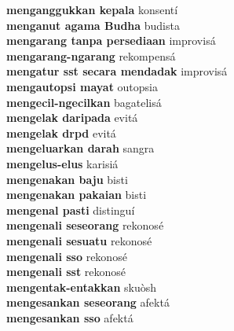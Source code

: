 \textbf{ menganggukkan kepala  } konsentí \\
\textbf{ menganut agama Budha  } budista \\
\textbf{ mengarang tanpa persediaan  } improvisá \\
\textbf{ mengarang-ngarang  } rekompensá \\
\textbf{ mengatur sst secara mendadak  } improvisá \\
\textbf{ mengautopsi mayat  } outopsia \\
\textbf{ mengecil-ngecilkan  } bagatelisá \\
\textbf{ mengelak daripada  } evitá \\
\textbf{ mengelak drpd  } evitá \\
\textbf{ mengeluarkan darah  } sangra \\
\textbf{ mengelus-elus  } karisiá \\
\textbf{ mengenakan baju  } bisti \\
\textbf{ mengenakan pakaian  } bisti \\
\textbf{ mengenal pasti  } distinguí \\
\textbf{ mengenali seseorang  } rekonosé \\
\textbf{ mengenali sesuatu  } rekonosé \\
\textbf{ mengenali sso  } rekonosé \\
\textbf{ mengenali sst  } rekonosé \\
\textbf{ mengentak-entakkan  } skuòsh \\
\textbf{ mengesankan seseorang  } afektá \\
\textbf{ mengesankan sso  } afektá \\
